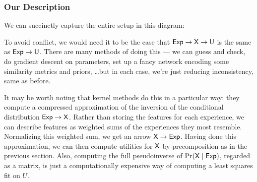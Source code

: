 \documentclass{article}
\begin{document}
	\subsubsection{Our Description}
	We can succinctly capture the entire setup in this diagram:
	
	\begin{center}
	\end{center}
		
	To avoid conflict, we would need it to be the case that $\sf Exp \to X \to U$ is the same as $\sf Exp \to U$. There are many methods of doing this --- we can  guess and check, do gradient descent on parameters, set up a fancy network encoding some similarity metrics and priors, \ldots but in each case, we're just reducing inconsistency, same as before. 
	
	It may be worth noting that kernel methods do this in a particular way: they compute a compressed approximation of the inversion of the conditional distribution $\sf Exp \to X$. Rather than storing the features for each experience, we can describe features as weighted sums of the experiences they most resemble. Normalizing this weighted sum, we get an arrow  $\sf X \to Exp$. Having done this approximation, we can then compute utilities for $\sf X$ by precomposition as in the previous section. Also, computing the full pseudoinverse of $\Pr(\sf X \mid Exp)$, regarded as a matrix, is just a computationally expensive way of computing a least squares fit on $U$.
	
\end{document}
